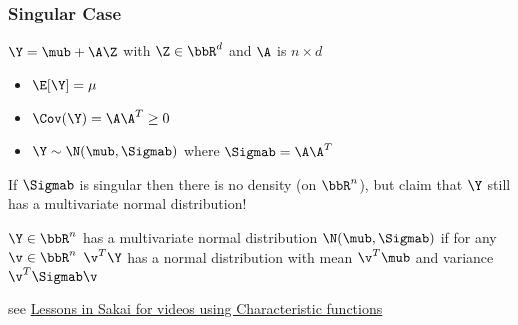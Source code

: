 \documentclass[handout]{beamer}
\begin{document}

\begin{frame} \frametitle{Singular Case}
$\Y = \mub + \A \Z$  with $\Z \in \bbR^d$ and $\A$ is $n \times d$ \pause
\begin{itemize}
\item $\E[\Y] = \mu$ \pause
\item $\Cov(\Y) = \A \A^T \ge 0$ \pause
\item $\Y \sim \N(\mub, \Sigmab)$ where $\Sigmab = \A \A^T$
\end{itemize}
  If $\Sigmab$ is singular then there is no density (on $\bbR^n$), but claim that
  $\Y$ still has a multivariate normal distribution!  \pause

 \begin{definition}
  $\Y \in \bbR^n$ has a  multivariate normal distribution $\N(\mub,
  \Sigmab)$ if for any $\v \in \bbR^n$ $\v^T\Y$ has a normal
  distribution with mean $\v^T\mub$ and variance $\v^T\Sigmab \v$
  \end{definition} \pause

see
\href{https://sakai.duke.edu/portal/site/79ac6ecf-19ee-496f-889b-1b3f6668eca9/page/3ea2b213-a451-4743-a788-610173b5b888}{Lessons
  in Sakai for videos using Characteristic functions}
\end{frame}
\end{document}
